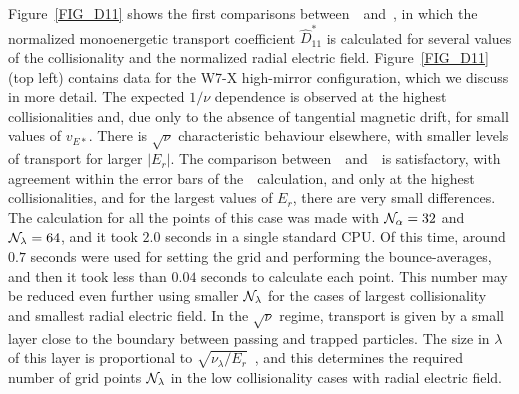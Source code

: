 Figure~\ref{FIG_D11} shows the first comparisons between~\KNOSOS~and~\DKES, in which the normalized monoenergetic transport coefficient $\hat D_{11}^*$ is calculated for several values of the collisionality and the normalized radial electric field.  Figure~\ref{FIG_D11} (top left) contains data for the W7-X high-mirror configuration, which we discuss in more detail. The expected $1/\nu$ dependence is observed at the highest collisionalities and, due only to the absence of tangential magnetic drift, for small values of $v_{E*}$. There is $\sqrt{\nu}$ characteristic behaviour elsewhere, with smaller levels of transport for larger $|E_r|$. The comparison between~\KNOSOS~and~\DKES~is satisfactory, with agreement within the error bars of the~\DKES~calculation, and only at the highest collisionalities, and for the largest values of $E_r$,  there are very small differences. The calculation for all the points of this case was made with ${\cal{N}}_\alpha=32$   and ${\cal{N}}_\lambda=64$, and it took $2.0$ seconds in a single standard CPU. Of this time, around $0.7$ seconds were used for setting the grid and performing the bounce-averages, and then it took less than $0.04$ seconds to calculate each point. This number may be reduced even further using smaller ${\cal{N}}_\lambda$ for the cases of largest collisionality and smallest radial electric field. In the $\sqrt{\nu}$ regime, transport is given by a small layer close to the boundary between passing and trapped particles. The size in $\lambda$ of this layer is proportional to $\sqrt{\nu_\lambda/E_r}$~\citep{calvo2017sqrtnu}, and this determines the required number of grid points ${\cal{N}}_\lambda$ in the low collisionality cases with radial electric field.
